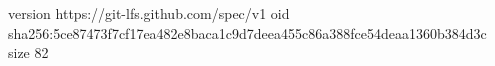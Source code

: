 version https://git-lfs.github.com/spec/v1
oid sha256:5ce87473f7cf17ea482e8baca1c9d7deea455c86a388fce54deaa1360b384d3c
size 82
